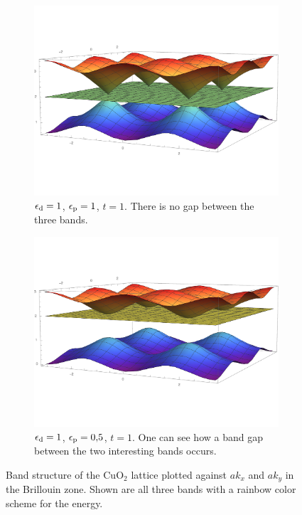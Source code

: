 \documentclass[11pt, english, fleqn, DIV=15, headinclude, BCOR=1cm]{scrartcl}
\begin{document}
\begin{figure}
    \centering
    \begin{subfigure}[t]{0.48\linewidth}
        \centering
        \includegraphics[width=\linewidth]{1_1_1.pdf}
        \caption{%
            $\epsilon_\mathrm d = \num{1}$,
            $\epsilon_\mathrm p = \num{1}$,
            $t = \num{1}$. There is no gap between the three bands.
        }
        \label{fig:/1}
    \end{subfigure}
    \hfill
    \begin{subfigure}[t]{0.48\linewidth}
        \centering
        \includegraphics[width=\linewidth]{05_1_1.pdf}
        \caption{%
            $\epsilon_\mathrm d = \num{1}$,
            $\epsilon_\mathrm p = \num{0.5}$,
            $t = \num{1}$. One can see how a band gap between the two
            interesting bands occurs.
        }
        \label{fig:/2}
    \end{subfigure}
    \caption{%
        Band structure of the $\mathrm{CuO_2}$ lattice plotted against $a k_x$
        and $a k_y$ in the Brillouin zone. Shown are all three bands with a
        rainbow color scheme for the energy.
    }
    \label{fig:}
\end{figure}
\end{document}
